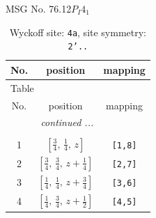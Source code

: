 \documentclass[fleqn,8pt]{jsarticle}
\begin{document}
\setcounter{MaxMatrixCols}{32}

\renewcommand{\tablename}{Table~}
\renewcommand{\figurename}{Figure~}
\begin{center}
\LARGE
MSG No. 76.12\quad$P_{I}4_{1}$
\end{center}
\renewcommand{\arraystretch}{1.2}
\begin{longtable}{ccc}
\caption{Wyckoff site: {\tt 4a}, site symmetry: {\tt 2'..}}
 \\
 \hline \hline
No. & position & mapping \\ \hline \endfirsthead

\multicolumn{2}{l}{\tablename\ \thetable{}} \\
 \hline \hline
No. & position & mapping \\ \hline \endhead

 \hline \hline
\multicolumn{2}{r}{\footnotesize\it continued ...} \\ \endfoot

 \hline \hline
\multicolumn{2}{r}{} \\ \endlastfoot

1 & $\left[ \frac{3}{4},\, \frac{1}{4},\, z \right]$ & {\tt [1,8]} \\ \hline
2 & $\left[ \frac{3}{4},\, \frac{3}{4},\, z + \frac{1}{4} \right]$ & {\tt [2,7]} \\ \hline
3 & $\left[ \frac{1}{4},\, \frac{1}{4},\, z + \frac{3}{4} \right]$ & {\tt [3,6]} \\ \hline
4 & $\left[ \frac{1}{4},\, \frac{3}{4},\, z + \frac{1}{2} \right]$ & {\tt [4,5]} \\
\end{longtable}
\renewcommand{\arraystretch}{1.2}
\end{document}
